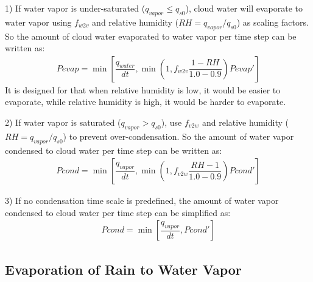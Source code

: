 \documentclass[letterpaper,titlepage,10pt]{article}
\numberwithin{equation}{section}
\begin{document}
1) If water vapor is under-saturated ($q_{vapor} \leq q_{s0}$), cloud water will evaporate to water vapor using $f_{w2v}$ and relative humidity ($RH = q_{vapor} / q_{s0}$) as scaling factors. So the amount of cloud water evaporated to water vapor per time step can be written as:
\begin{gather}
	Pevap = \min \left[\dfrac{q_{water}}{dt}, \min \left(1, f_{w2v} \dfrac{1 - RH}{1.0 - 0.9} \right) Pevap' \right]
\end{gather}
It is designed for that when relative humidity is low, it would be easier to evaporate, while relative humidity is high, it would be harder to evaporate.

2) If water vapor is saturated ($q_{vapor} > q_{s0}$), use $f_{v2w}$ and relative humidity ($RH = q_{vapor} / q_{s0}$) to prevent over-condensation. So the amount of water vapor condensed to cloud water per time step can be written as:
\begin{gather}
	Pcond = \min \left[\dfrac{q_{vapor}}{dt}, \min \left(1, f_{v2w}  \dfrac{RH - 1}{1.0 - 0.9} \right) Pcond'  \right]
\end{gather}

3) If no condensation time scale is predefined, the amount of water vapor condensed to cloud water per time step can be simplified as:
\begin{gather}
	Pcond = \min \left[\dfrac{q_{vapor}}{dt}, Pcond'  \right]
\end{gather}


\subsection{Evaporation of Rain to Water Vapor}
\end{document}
